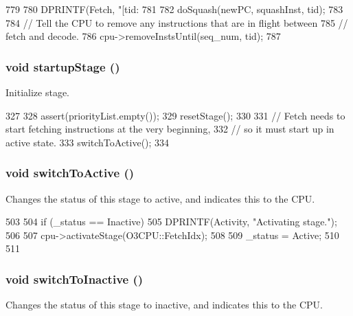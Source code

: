 \begin{DoxyCode}
779 {
780     DPRINTF(Fetch, "[tid:%
781 
782     doSquash(newPC, squashInst, tid);
783 
784     // Tell the CPU to remove any instructions that are in flight between
785     // fetch and decode.
786     cpu->removeInstsUntil(seq_num, tid);
787 }
\end{DoxyCode}
\hypertarget{classDefaultFetch_a31d4cbdab16d4ff8d6bc7f84ece727da}{
\subsubsection[{startupStage}]{\setlength{\rightskip}{0pt plus 5cm}void startupStage ()}}
\label{classDefaultFetch_a31d4cbdab16d4ff8d6bc7f84ece727da}
Initialize stage. 


\begin{DoxyCode}
327 {
328     assert(priorityList.empty());
329     resetStage();
330 
331     // Fetch needs to start fetching instructions at the very beginning,
332     // so it must start up in active state.
333     switchToActive();
334 }
\end{DoxyCode}
\hypertarget{classDefaultFetch_a03ce24cba34d3da5948f54e10f8710a9}{
\subsubsection[{switchToActive}]{\setlength{\rightskip}{0pt plus 5cm}void switchToActive ()}}
\label{classDefaultFetch_a03ce24cba34d3da5948f54e10f8710a9}
Changes the status of this stage to active, and indicates this to the CPU. 


\begin{DoxyCode}
503 {
504     if (_status == Inactive) {
505         DPRINTF(Activity, "Activating stage.\n");
506 
507         cpu->activateStage(O3CPU::FetchIdx);
508 
509         _status = Active;
510     }
511 }
\end{DoxyCode}
\hypertarget{classDefaultFetch_a8ef9d48876d3014250c97bfba41a42cd}{
\subsubsection[{switchToInactive}]{\setlength{\rightskip}{0pt plus 5cm}void switchToInactive ()}}
\label{classDefaultFetch_a8ef9d48876d3014250c97bfba41a42cd}
Changes the status of this stage to inactive, and indicates this to the CPU. 


